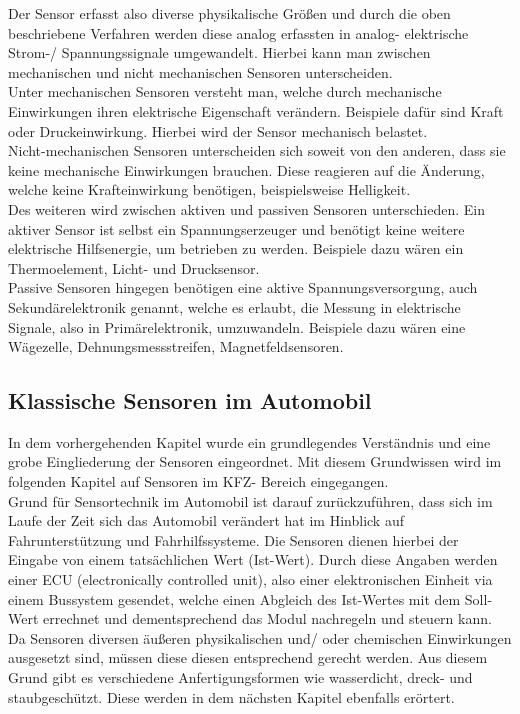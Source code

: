 						Der Sensor erfasst also diverse physikalische Größen und durch die oben beschriebene Verfahren werden diese analog erfassten in analog- elektrische Strom-/ Spannungssignale umgewandelt.
						Hierbei kann man zwischen mechanischen und nicht mechanischen Sensoren unterscheiden.\\
						Unter mechanischen Sensoren versteht man, welche durch mechanische Einwirkungen ihren elektrische Eigenschaft verändern. Beispiele dafür sind Kraft oder Druckeinwirkung. Hierbei wird der Sensor mechanisch belastet.\\
						Nicht-mechanischen Sensoren unterscheiden sich soweit von den anderen, dass sie keine mechanische Einwirkungen brauchen. Diese reagieren auf die Änderung, welche keine Krafteinwirkung benötigen, beispielsweise Helligkeit.\cite{TS_sensoren}\\
						Des weiteren wird zwischen aktiven und passiven Sensoren unterschieden. Ein aktiver Sensor ist selbst ein Spannungserzeuger und benötigt keine weitere elektrische Hilfsenergie, um betrieben zu werden. Beispiele dazu wären ein Thermoelement, Licht- und Drucksensor.\\
						Passive Sensoren hingegen benötigen eine aktive Spannungsversorgung, auch Sekundärelektronik genannt, welche es erlaubt, die Messung in elektrische Signale, also in Primärelektronik, umzuwandeln. Beispiele dazu wären eine Wägezelle, Dehnungsmessstreifen, Magnetfeldsensoren.		
									
												
		\subsection{Klassische Sensoren im Automobil} 

				In dem vorhergehenden Kapitel wurde ein grundlegendes Verständnis und eine grobe Eingliederung der Sensoren eingeordnet. Mit diesem Grundwissen wird im folgenden Kapitel auf Sensoren im KFZ- Bereich eingegangen.\\
				Grund für Sensortechnik im Automobil ist darauf zurückzuführen, dass sich im Laufe der Zeit sich das Automobil verändert hat im Hinblick auf Fahrunterstützung und Fahrhilfssysteme.
				Die Sensoren dienen hierbei der Eingabe von einem tatsächlichen Wert (Ist-Wert). Durch diese Angaben werden einer ECU (electronically controlled unit), also einer elektronischen Einheit via einem Bussystem gesendet, welche einen Abgleich des Ist-Wertes mit dem Soll-Wert errechnet und dementsprechend das Modul nachregeln und steuern kann. \\ 
				Da Sensoren diversen äußeren physikalischen und/ oder chemischen Einwirkungen ausgesetzt sind, müssen diese diesen entsprechend gerecht werden. Aus diesem Grund gibt es verschiedene Anfertigungsformen wie wasserdicht, dreck- und staubgeschützt. Diese werden in dem nächsten Kapitel ebenfalls erörtert.\\  
				
